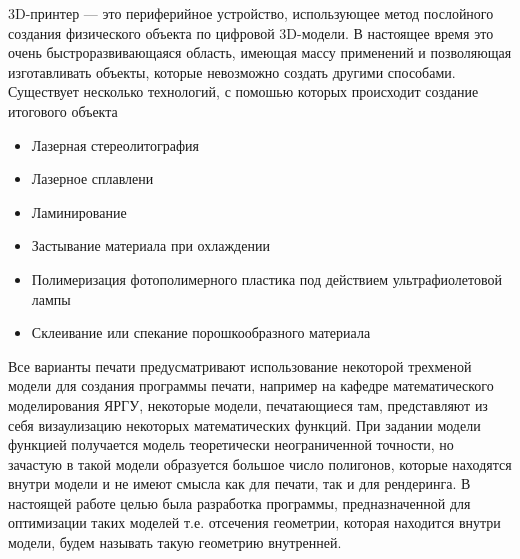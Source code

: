 \clearpage
{}
3D-принтер — это периферийное устройство, использующее метод послойного создания физического объекта по цифровой 3D-модели. В настоящее время это очень быстроразвивающаяся область, имеющая массу применений и позволяющая изготавливать объекты, которые невозможно создать другими способами. Существует несколько технологий, с помошью которых происходит создание итогового объекта

\begin{itemize}
\item Лазерная стереолитография
\item Лазерное сплавлени
\item Ламинирование
\item Застывание материала при охлаждении
\item Полимеризация фотополимерного пластика под действием ультрафиолетовой лампы
\item Склеивание или спекание порошкообразного материала
\end{itemize}

Все варианты печати предусматривают использование некоторой трехменой модели для создания программы печати, например на кафедре математического моделирования ЯРГУ, некоторые модели, печатающиеся там, представляют из себя визаулизацию некоторых математических функций. При задании модели функцией получается модель теоретически неограниченной точности, но зачастую в такой модели образуется большое число полигонов, которые находятся внутри модели и не имеют смысла как для печати, так и для рендеринга. В настоящей работе целью была разработка программы, предназначенной для оптимизации таких моделей т.е. отсечения геометрии, которая находится внутри модели, будем называть такую геометрию внутренней.
